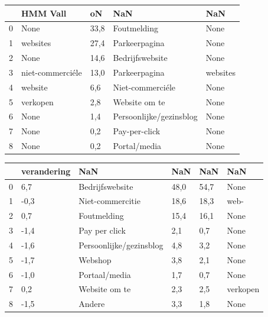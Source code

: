 \begin{tabular}{lllll}
\toprule
{} &          HMM Vall &    oN &                      NaN &       NaN \\
\midrule
0 &              None &  33,8 &              Foutmelding &      None \\
1 &          websites &  27,4 &            Parkeerpagina &      None \\
2 &              None &  14,6 &          Bedrijfswebsite &      None \\
3 &  niet-commerciéle &  13,0 &            Parkeerpagina &  websites \\
4 &           website &   6,6 &         Niet-commerciéle &      None \\
5 &          verkopen &   2,8 &            Website om te &      None \\
6 &              None &   1,4 &  Persoonlijke/gezinsblog &      None \\
7 &              None &   0,2 &            Pay-per-click &      None \\
8 &              None &   0,2 &             Portal/media &      None \\
\bottomrule
\end{tabular}

\begin{tabular}{llllll}
\toprule
{} & verandering &                      NaN &   NaN &   NaN &       NaN \\
\midrule
0 &         6,7 &          Bedrijfswebsite &  48,0 &  54,7 &      None \\
1 &        -0,3 &         Niet-commercitie &  18,6 &  18,3 &      web- \\
2 &         0,7 &              Foutmelding &  15,4 &  16,1 &      None \\
3 &        -1,4 &            Pay per click &   2,1 &   0,7 &      None \\
4 &        -1,6 &  Persoonlijke/gezinsblog &   4,8 &   3,2 &      None \\
5 &        -1,7 &                  Webshop &   3,8 &   2,1 &      None \\
6 &        -1,0 &            Portaal/media &   1,7 &   0,7 &      None \\
7 &         0,2 &            Website om te &   2,3 &   2,5 &  verkopen \\
8 &        -1,5 &                   Andere &   3,3 &   1,8 &      None \\
\bottomrule
\end{tabular}

